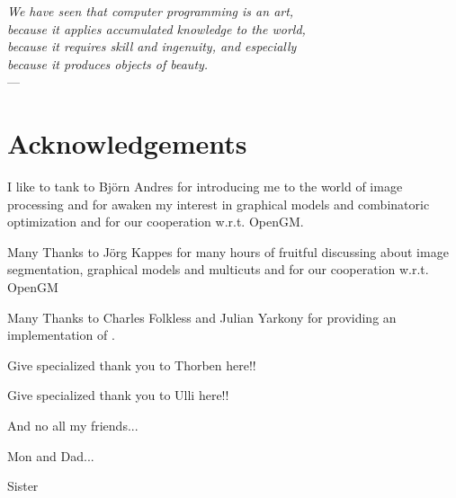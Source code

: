 

\begin{flushright}{\slshape    
We have seen that computer programming is an art, \\ 
because it applies accumulated knowledge to the world, \\ 
because it requires skill and ingenuity, and especially \\
because it produces objects of beauty.} \\ \medskip
---  \citep{knuth:1974}
\end{flushright}

\bigskip


\begingroup

\let\clearpage\relax
\let\cleardoublepage\relax
\let\cleardoublepage\relax

\chapter*{Acknowledgements} %

\noindent I like to tank to Bj\"orn Andres for introducing me to the world of image processing 
and for awaken my interest in graphical models and combinatoric optimization and for our cooperation w.r.t. OpenGM.


\noindent Many Thanks to J\"org Kappes for many hours of fruitful discussing about image segmentation,
graphical models and multicuts and for our cooperation w.r.t. OpenGM


\noindent Many Thanks to Charles Folkless and Julian Yarkony for providing 
an implementation of \citep{yarkony_2012_eccv}.


\bigskip

\noindent Give specialized thank you to Thorben here!!

\bigskip

\noindent Give specialized thank you to Ulli here!!



\bigskip
\noindent And no all my friends...

\bigskip
\noindent Mon and Dad...

\bigskip
\noindent Sister

\endgroup